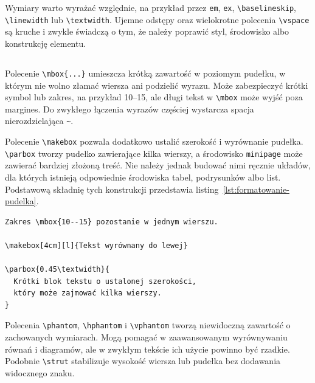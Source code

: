 Wymiary warto wyrażać względnie, na przykład przez \verb|em|, \verb|ex|, \verb|\baselineskip|, \verb|\linewidth| lub \verb|\textwidth|. Ujemne odstępy oraz wielokrotne polecenia \verb|\vspace| są kruche i zwykle świadczą o tym, że należy poprawić styl, środowisko albo konstrukcję elementu.

\subsection{}

Polecenie \verb|\mbox{...}| umieszcza krótką zawartość w poziomym pudełku, w którym nie wolno złamać wiersza ani podzielić wyrazu. Może zabezpieczyć krótki symbol lub zakres, na przykład \mbox{10--15}, ale długi tekst w \verb|\mbox| może wyjść poza margines. Do zwykłego łączenia wyrazów częściej wystarcza spacja nierozdzielająca \verb|~|.

Polecenie \verb|\makebox| pozwala dodatkowo ustalić szerokość i wyrównanie pudełka. \verb|\parbox| tworzy pudełko zawierające kilka wierszy, a środowisko \texttt{minipage} może zawierać bardziej złożoną treść. Nie należy jednak budować nimi ręcznie układów, dla których istnieją odpowiednie środowiska tabel, podrysunków albo list. Podstawową składnię tych konstrukcji przedstawia listing~\ref{lst:formatowanie-pudelka}.

\begin{lstlisting}[style=thesis,caption={Podstawowe pudełka tekstowe},label={lst:formatowanie-pudelka}]
Zakres \mbox{10--15} pozostanie w jednym wierszu.

\makebox[4cm][l]{Tekst wyrównany do lewej}

\parbox{0.45\textwidth}{
  Krótki blok tekstu o ustalonej szerokości,
  który może zajmować kilka wierszy.
}
\end{lstlisting}

Polecenia \verb|\phantom|, \verb|\hphantom| i \verb|\vphantom| tworzą niewidoczną zawartość o zachowanych wymiarach. Mogą pomagać w zaawansowanym wyrównywaniu równań i diagramów, ale w zwykłym tekście ich użycie powinno być rzadkie. Podobnie \verb|\strut| stabilizuje wysokość wiersza lub pudełka bez dodawania widocznego znaku.

\subsection{}

